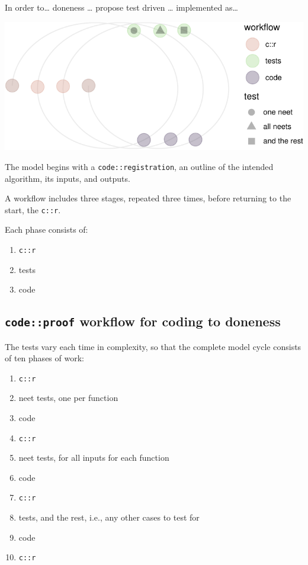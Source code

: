 \documentclass[
]{article}
\providecommand{\tightlist}{%
  \setlength{\itemsep}{0pt}\setlength{\parskip}{0pt}}
\begin{document}
In order to\ldots{} doneness \ldots{} propose test driven \ldots{}
implemented as\ldots{}

\begin{center}\includegraphics{when-is-done-done_files/figure-latex/unnamed-chunk-2-1} \end{center}

The model begins with a \texttt{code::registration}, an outline of the
intended algorithm, its inputs, and outputs.

A workflow includes three stages, repeated three times, before returning
to the start, the \texttt{c::r}.

Each phase consists of:

\begin{enumerate}
\def\labelenumi{\arabic{enumi}.}
\tightlist
\item
  \texttt{c::r}
\item
  tests
\item
  code
\end{enumerate}

\hypertarget{codeproof-workflow-for-coding-to-doneness}{%
\subsection{\texorpdfstring{\texttt{code::proof} workflow for coding to
doneness}{code::proof workflow for coding to doneness}}\label{codeproof-workflow-for-coding-to-doneness}}

The tests vary each time in complexity, so that the complete model cycle
consists of ten phases of work:

\begin{enumerate}
\def\labelenumi{\arabic{enumi}.}
\tightlist
\item
  \texttt{c::r}
\item
  neet tests, one per function
\item
  code
\item
  \texttt{c::r}
\item
  neet tests, for all inputs for each function
\item
  code
\item
  \texttt{c::r}
\item
  tests, and the rest, i.e., any other cases to test for
\item
  code
\item
  \texttt{c::r}
\end{enumerate}
\end{document}
